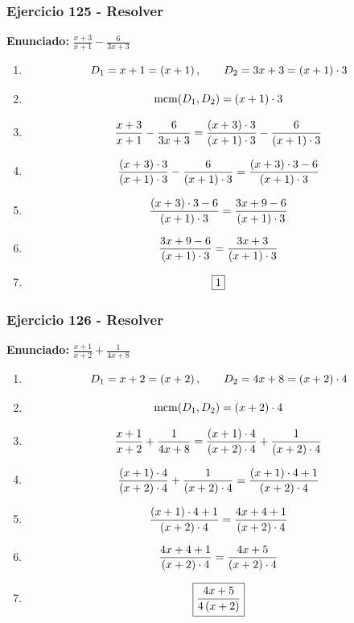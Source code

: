 \documentclass[11pt,a4paper]{article}
\newcommand{\fitmath}[1]{%
\[
\setbox0=\hbox{$\displaystyle #1$}%
\ifdim\wd0>\linewidth
\resizebox{\linewidth}{!}{$\displaystyle #1$}%
\else
#1%
\fi
\]
}
\begin{document}
\vspace{0.12cm}
\subsubsection*{Ejercicio 125 - Resolver}
\textbf{Enunciado:} $ \frac{x + 3}{x + 1} - \frac{6}{3 x + 3} $\par
\begin{enumerate}[leftmargin=2em]
\item \fitmath{D_1=x + 1=\left(x + 1\right),\qquad D_2=3 x + 3=\left(x + 1\right)\cdot 3}
\item \fitmath{\operatorname{mcm}(D_1,D_2)=\left(x + 1\right)\cdot 3}
\item \fitmath{\frac{x + 3}{x + 1} - \frac{6}{3 x + 3}= \frac{\left(x + 3\right)\cdot 3}{\left(x + 1\right)\cdot 3} - \frac{6}{\left(x + 1\right)\cdot 3}}
\item \fitmath{\frac{\left(x + 3\right)\cdot 3}{\left(x + 1\right)\cdot 3} - \frac{6}{\left(x + 1\right)\cdot 3}=\frac{\left(x + 3\right)\cdot 3 - 6}{\left(x + 1\right)\cdot 3}}
\item \fitmath{\frac{\left(x + 3\right)\cdot 3 - 6}{\left(x + 1\right)\cdot 3}=\frac{3 x + 9 - 6}{\left(x + 1\right)\cdot 3}}
\item \fitmath{\frac{3 x + 9 - 6}{\left(x + 1\right)\cdot 3}=\frac{3 x + 3}{\left(x + 1\right)\cdot 3}}
\item \fitmath{\boxed{1}}
\end{enumerate}

\vspace{0.12cm}
\subsubsection*{Ejercicio 126 - Resolver}
\textbf{Enunciado:} $ \frac{x + 1}{x + 2} + \frac{1}{4 x + 8} $\par
\begin{enumerate}[leftmargin=2em]
\item \fitmath{D_1=x + 2=\left(x + 2\right),\qquad D_2=4 x + 8=\left(x + 2\right)\cdot 4}
\item \fitmath{\operatorname{mcm}(D_1,D_2)=\left(x + 2\right)\cdot 4}
\item \fitmath{\frac{x + 1}{x + 2} + \frac{1}{4 x + 8}= \frac{\left(x + 1\right)\cdot 4}{\left(x + 2\right)\cdot 4} + \frac{1}{\left(x + 2\right)\cdot 4}}
\item \fitmath{\frac{\left(x + 1\right)\cdot 4}{\left(x + 2\right)\cdot 4} + \frac{1}{\left(x + 2\right)\cdot 4}=\frac{\left(x + 1\right)\cdot 4 + 1}{\left(x + 2\right)\cdot 4}}
\item \fitmath{\frac{\left(x + 1\right)\cdot 4 + 1}{\left(x + 2\right)\cdot 4}=\frac{4 x + 4 + 1}{\left(x + 2\right)\cdot 4}}
\item \fitmath{\frac{4 x + 4 + 1}{\left(x + 2\right)\cdot 4}=\frac{4 x + 5}{\left(x + 2\right)\cdot 4}}
\item \fitmath{\boxed{\frac{4 x + 5}{4 \left(x + 2\right)}}}
\end{enumerate}
\end{document}
